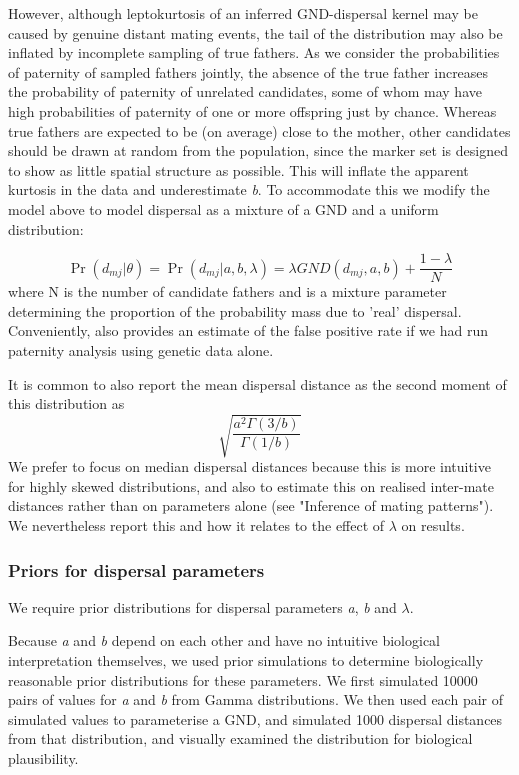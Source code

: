 \documentclass[10pt, a4paper, twocolumn]{article} %
\begin{document}
However, although leptokurtosis of an inferred GND-dispersal kernel may be caused by genuine distant mating events, the tail of the distribution may also be inflated by incomplete sampling of true fathers. As we consider the probabilities of paternity of sampled fathers jointly, the absence of the true father increases the probability of paternity of unrelated candidates, some of whom may have high probabilities of paternity of one or more offspring just by chance. Whereas true fathers are expected to be (on average) close to the mother, other candidates should be drawn at random from the population, since the marker set is designed to show as little spatial structure as possible. This will inflate the apparent kurtosis in the data and underestimate \textit{b}. To accommodate this we modify the model above to model dispersal as a mixture of a GND and a uniform distribution:

\begin{equation}\label{eqn:mixture_model}
\Pr(d_{mj} | \theta) = \Pr(d_{mj} | a,b,\lambda) = \lambda GND(d_{mj},a,b) + \frac{1-\lambda}{N}
\end{equation}
where N is the number of candidate fathers and  is a mixture parameter determining the proportion of the probability mass due to ’real’ dispersal. Conveniently, also provides an estimate of the false positive rate if we had run paternity analysis using genetic data alone.

It is common to also report the mean dispersal distance as the second moment of this distribution as
\begin{equation}
\label{eqn:sd_GND}    
\sqrt{ \frac{ a^2 \Gamma(3/b) }{ \Gamma(1/b) } }
\end{equation}
We prefer to focus on median dispersal distances because this is more intuitive for highly skewed distributions, and also to estimate this on realised inter-mate distances rather than on parameters alone (see "Inference of mating patterns"). We nevertheless report this and how it relates to the effect of $\lambda$ on results.

\subsubsection{Priors for dispersal parameters}

We require prior distributions for dispersal parameters \textit{a}, \textit{b} and $\lambda$.

Because \textit{a} and \textit{b} depend on each other and have no intuitive biological interpretation themselves, we used prior simulations to determine biologically reasonable prior distributions for these parameters. We first simulated 10000 pairs of values for \textit{a} and \textit{b} from Gamma distributions. We then used each pair of simulated values to parameterise a GND, and simulated 1000 dispersal distances from that distribution, and visually examined the distribution for biological plausibility.
\end{document}
